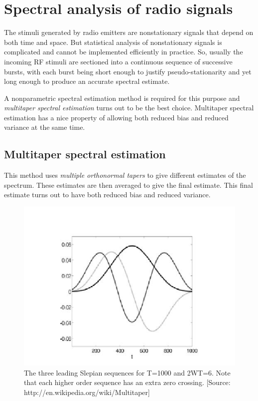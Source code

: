 \documentclass[12pt]{article}
\begin{document}
\section{Spectral analysis of radio signals}

The stimuli generated by radio emitters are nonstationary signals that depend on both time and space. But statistical analysis of nonstationary signals is complicated and cannot be implemented efficiently in practice. So, usually the incoming RF stimuli are sectioned into a continuous sequence of successive bursts, with each burst being short enough to justify pseudo-stationarity and yet long enough to produce an accurate spectral estimate\cite{haykin2009, haykin2005}.


A nonparametric spectral estimation method is required for this purpose and \emph{multitaper spectral estimation}\cite{haykin2009, thomson1982, percival1993} turns out to be the best choice. Multitaper spectral estimation has a nice property of allowing both reduced bias and reduced variance at the same time.

\subsection*{Multitaper spectral estimation}
This method uses \emph{multiple orthonormal tapers}\cite{haykin2009, thomson1982} to give different estimates of the spectrum. These estimates are then averaged to give the final estimate. This final estimate turns out to have both reduced bias and reduced variance\cite{haykin2009, thomson1982, percival1993}.


\begin{figure}
\centering
\includegraphics[width=0.65\linewidth]{DPSS_figure.jpg}
\caption{The three leading Slepian sequences for T=1000 and 2WT=6. Note that each higher order sequence has an extra zero crossing. [Source: http://en.wikipedia.org/wiki/Multitaper]}
\end{figure}
\end{document}
